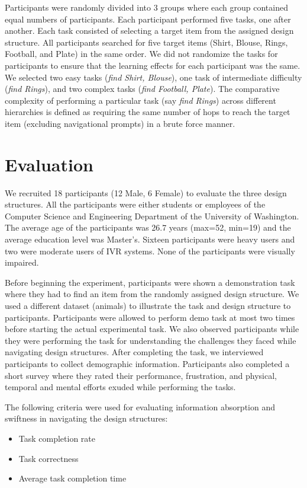 \documentclass{sigchi}
\begin{document}
Participants were randomly divided into 3 groups where each group contained equal numbers of participants. Each participant performed five tasks, one after another. Each task consisted of selecting a target item from the assigned design structure. All participants searched for five target items (Shirt, Blouse, Rings, Football, and Plate) in the same order. We did not randomize the tasks for participants to ensure that the learning effects for each participant was the same. We selected two easy tasks (\textit{find Shirt, Blouse}), one task of intermediate difficulty (\textit{find Rings}), and two complex tasks (\textit{find Football, Plate}). The comparative complexity of performing a particular task (say \textit{find Rings}) across different hierarchies is defined as requiring the same number of hops to reach the target item (excluding navigational prompts) in a brute force manner.  

\section{Evaluation}
We recruited 18 participants (12 Male, 6 Female) to evaluate the three design structures. All the participants were either students or employees of the Computer Science and Engineering Department of the University of Washington. The average age of the participants was 26.7 years (max=52, min=19) and the average education level was Master's. Sixteen participants were heavy users and two were moderate users of IVR systems. None of the participants were visually impaired. 

Before beginning the experiment, participants were shown a demonstration task where they had to find an item from the randomly assigned design structure. We used a different dataset (animals) to illustrate the task and design structure to participants. Participants were allowed to perform demo task at most two times before starting the actual experimental task. We also observed participants while they were performing the task for understanding the challenges they faced while navigating design structures. After completing the task, we interviewed participants to collect demographic information. Participants also completed a short survey where they rated their performance, frustration, and physical, temporal and mental efforts exuded while performing the tasks. 

The following criteria were used for evaluating information absorption and swiftness in navigating the design structures:
\begin{itemize}
\item Task completion rate
\item Task correctness
\item Average task completion time
\end{itemize}
\end{document}
